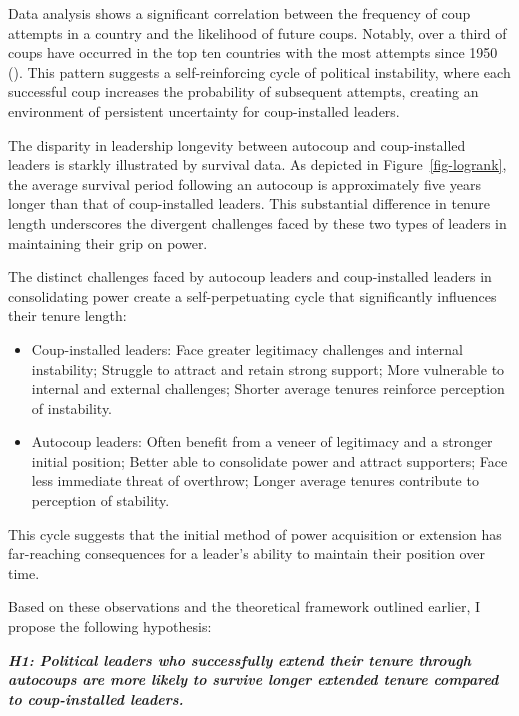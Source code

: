 \documentclass[
  12pt,
]{article}
\begin{document}
Data analysis shows a significant correlation between the frequency of
coup attempts in a country and the likelihood of future coups. Notably,
over a third of coups have occurred in the top ten countries with the
most attempts since 1950 (). This pattern suggests a self-reinforcing cycle of political
instability, where each successful coup increases the probability of
subsequent attempts, creating an environment of persistent uncertainty
for coup-installed leaders.

The disparity in leadership longevity between autocoup and
coup-installed leaders is starkly illustrated by survival data. As
depicted in Figure~\ref{fig-logrank}, the average survival period
following an autocoup is approximately five years longer than that of
coup-installed leaders. This substantial difference in tenure length
underscores the divergent challenges faced by these two types of leaders
in maintaining their grip on power.

The distinct challenges faced by autocoup leaders and coup-installed
leaders in consolidating power create a self-perpetuating cycle that
significantly influences their tenure length:

\begin{itemize}
\item
  Coup-installed leaders: Face greater legitimacy challenges and
  internal instability; Struggle to attract and retain strong support;
  More vulnerable to internal and external challenges; Shorter average
  tenures reinforce perception of instability.
\item
  Autocoup leaders: Often benefit from a veneer of legitimacy and a
  stronger initial position; Better able to consolidate power and
  attract supporters; Face less immediate threat of overthrow; Longer
  average tenures contribute to perception of stability.
\end{itemize}

This cycle suggests that the initial method of power acquisition or
extension has far-reaching consequences for a leader's ability to
maintain their position over time.

Based on these observations and the theoretical framework outlined
earlier, I propose the following hypothesis:

\textbf{\emph{H1: Political leaders who successfully extend their tenure
through autocoups are more likely to survive longer extended tenure
compared to coup-installed leaders.}}
\end{document}
